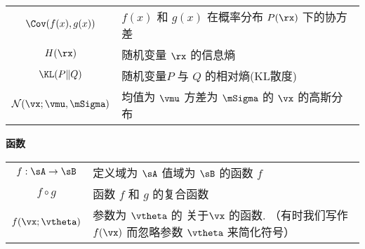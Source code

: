 \begin{minipage}{\textwidth}
\begin{tabular}{cp{3.25in}}
$\displaystyle \Cov(f(x),g(x)) $ & $f(x)$ 和 $g(x)$ 在概率分布 $P(\rx)$ 下的协方差\\
$\displaystyle H(\rx) $ & 随机变量 $\rx$ 的信息熵 \\
$\displaystyle \KL ( P \Vert Q ) $ & 随机变量$P$ 与 $Q$ 的相对熵(KL散度) \\
$\displaystyle \mathcal{N} ( \vx ; \vmu , \mSigma)$ & 均值为 $\vmu$ 方差为 $\mSigma$ 的 $\vx$ 的高斯分布 \\
\end{tabular}
\egroup
{}
\end{minipage}

\vspace{\notationgap}
\begin{minipage}{\textwidth}
\centerline{\bf 函数}
\bgroup
\def\arraystretch{1.5}
\begin{tabular}{cp{3.25in}}
$\displaystyle f: \sA \rightarrow \sB$ & 定义域为 $\sA$ 值域为 $\sB$ 的函数 $f$ \\
$\displaystyle f \circ g $ & 函数 $f$ 和 $g$ 的复合函数 \\
  $\displaystyle f(\vx ; \vtheta) $ & 参数为 $\vtheta$ 的 关于$\vx$ 的函数.
  （有时我们写作 $f(\vx)$ 而忽略参数 $\vtheta$ 来简化符号）\\

\end{tabular}
\end{minipage}

